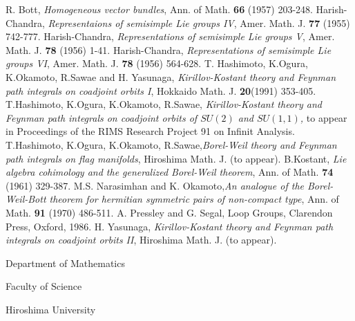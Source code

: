 \begin{thebibliography}{99}
 R. Bott, \textit{Homogeneous vector bundles}, Ann. of Math. {\bf 66} (1957) 203-248.
 Harish-Chandra, \textit{Representaions of semisimple Lie groups IV}, Amer. Math. J. {\bf 77} (1955) 742-777.
 Harish-Chandra, \textit{Representations of semisimple Lie groups V}, Amer. Math. J. {\bf 78} (1956) 1-41.
 Harish-Chandra, \textit{Representations of semisimple Lie groups VI}, Amer. Math. J. {\bf 78} (1956) 564-628.
 T. Hashimoto, K.Ogura, K.Okamoto, R.Sawae and H. Yasunaga, \textit{Kirillov-Kostant theory and Feynman path integrals on coadjoint orbits I}, Hokkaido Math. J. {\bf 20}(1991) 353-405.
 T.Hashimoto, K.Ogura, K.Okamoto, R.Sawae, \textit{Kirillov-Kostant theory and Feynman path integrals on coadjoint orbits of $SU(2)$ and $SU(1,1)$,} to appear in Proceedings of the RIMS Research Project 91 on Infinit Analysis.
T.Hashimoto, K.Ogura, K.Okamoto, R.Sawae,\textit{Borel-Weil theory and Feynman path integrals on flag manifolds}, Hiroshima Math. J. (to appear). 
 B.Kostant, \textit{Lie algebra cohimology and the generalized Borel-Weil theorem}, Ann. of Math.
{\bf 74} (1961) 329-387.
 M.S. Narasimhan  and K. Okamoto,\textit{An analogue of the Borel-Weil-Bott theorem for hermitian symmetric pairs of non-compact type}, Ann. of Math. {\bf 91} (1970) 486-511.
 A. Pressley and G. Segal, Loop Groups, Clarendon Press, Oxford, 1986.
H. Yasunaga, \textit{Kirillov-Kostant theory and Feynman path integrals on coadjoint orbits II}, Hiroshima Math. J. (to appear).
\end{thebibliography}

\begin{flushleft}
Department of Mathematics

Faculty of Science

Hiroshima University
\end{flushleft}
